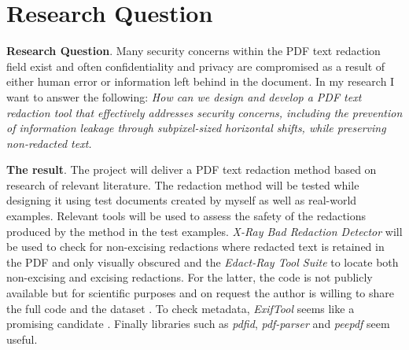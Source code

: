 \section{Research Question}

\textbf{Research Question}. Many security concerns within the PDF text redaction field exist and often confidentiality and privacy are compromised as a result of either human error or information left behind in the document. In my research I want to answer the following: \textit{How can we design and develop a PDF text redaction tool that effectively addresses security concerns, including the prevention of information leakage through subpixel-sized horizontal shifts, while preserving non-redacted text.} 

\textbf{The result}. The project will deliver a PDF text redaction method based on research of relevant literature. The redaction method will be tested while designing it using test documents created by myself as well as real-world examples. Relevant tools will be used to assess the safety of the redactions produced by the method in the test examples. \textit{X-Ray Bad Redaction Detector}\cite{Xray2021} will be used to check for non-excising redactions where redacted text is retained in the PDF and only visually obscured and the \textit{Edact-Ray Tool Suite}\cite{bland2022story} to locate both non-excising and excising redactions. For the latter, the code is not publicly available but for scientific purposes and on request the author is willing to share the full code and the dataset \cite{MaxellCode2021}. To check metadata, \textit{ExifTool} seems like a promising candidate \cite{ExitfoolHarvey}. Finally libraries such as \textit{pdfid}, \textit{pdf-parser} and \textit{peepdf} seem useful.